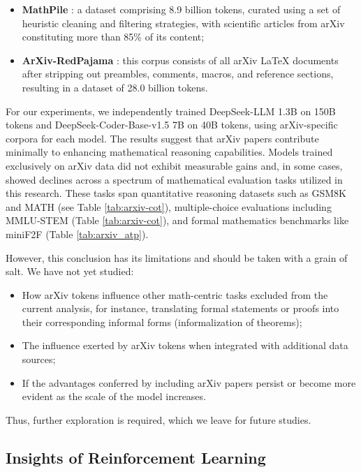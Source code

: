 \begin{itemize}[topsep=0pt]
\begin{itemize}[topsep=0pt]
\begin{itemize}[topsep=0pt]
    \item \textbf{MathPile} \citep{mathpile}: a dataset comprising 8.9 billion tokens, curated using a set of heuristic cleaning and filtering strategies, with scientific articles from arXiv constituting more than 85\% of its content;
    \item \textbf{ArXiv-RedPajama} \citep{redpajama}: this corpus consists of all arXiv LaTeX documents after stripping out preambles, comments, macros, and reference sections, resulting in a dataset of 28.0 billion tokens.
\end{itemize}

For our experiments, we independently trained DeepSeek-LLM 1.3B on 150B tokens and DeepSeek-Coder-Base-v1.5 7B on 40B tokens, using arXiv-specific corpora for each model. The results suggest that arXiv papers contribute minimally to enhancing mathematical reasoning capabilities. Models trained exclusively on arXiv data did not exhibit measurable gains and, in some cases, showed declines across a spectrum of mathematical evaluation tasks utilized in this research. These tasks span quantitative reasoning datasets such as GSM8K and MATH (see Table \ref{tab:arxiv-cot}), multiple-choice evaluations including MMLU-STEM (Table \ref{tab:arxiv-cot}), and formal mathematics benchmarks like miniF2F (Table \ref{tab:arxiv_atp}).

However, this conclusion has its limitations and should be taken with a grain of salt. We have not yet studied:

\begin{itemize}[topsep=0pt]
    \item How arXiv tokens influence other math-centric tasks excluded from the current analysis, for instance, translating formal statements or proofs into their corresponding informal forms (informalization of theorems);
    \item The influence exerted by arXiv tokens when integrated with additional data sources;
    \item If the advantages conferred by including arXiv papers persist or become more evident as the scale of the model increases.
\end{itemize}

Thus, further exploration is required, which we leave for future studies.

\subsection{Insights of Reinforcement Learning}

\end{itemize}
\end{itemize}
